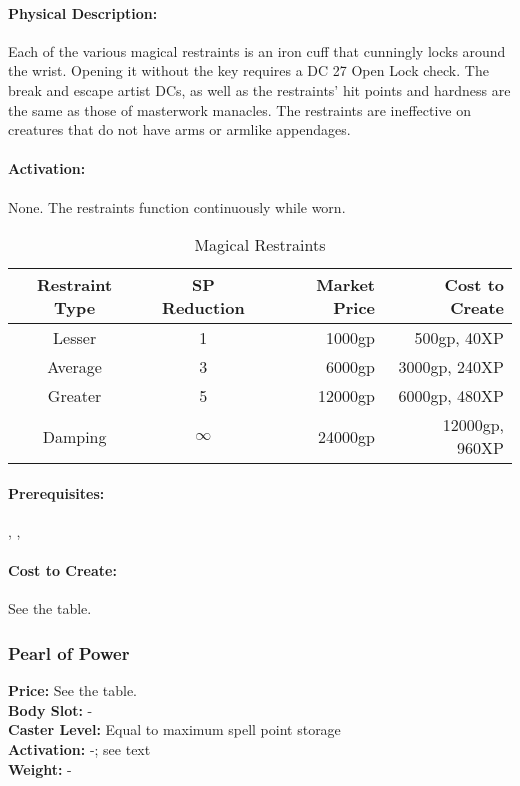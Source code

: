 \paragraph{Physical Description:} Each of the various magical restraints is an iron cuff that cunningly locks around the wrist. Opening it without the key requires a DC 27 Open Lock check. The break and escape artist DCs, as well as the restraints' hit points and hardness are the same as those of masterwork manacles. The restraints are ineffective on creatures that do not have arms or armlike appendages.

\paragraph{Activation:} None. The restraints function continuously while worn.

\begin{table*}
\caption{Magical Restraints}
\label{tab:MagicalRestraints}
\centering
\begin{tabular}{|c|c|r|r|}
\hline
\textbf{Restraint Type}&\textbf{SP Reduction}&\textbf{Market Price}&\textbf{Cost to Create}\\
\hline
Lesser&1&1000gp&500gp, 40XP\\
Average&3&6000gp&3000gp, 240XP\\
Greater&5&12000gp&6000gp, 480XP\\
Damping&$\infty$&24000gp&12000gp, 960XP\\
\hline
\end{tabular}
\end{table*}

\paragraph{Prerequisites:} , , 

\paragraph{Cost to Create:} See the  table.


\subsubsection{Pearl of Power}
\label{Item:PearlOfPower}
\textbf{Price:} See the  table.\\
\textbf{Body Slot:} -\\
\textbf{Caster Level:} Equal to maximum spell point storage\\
\textbf{Activation:} -; see text\\
\textbf{Weight:} -

